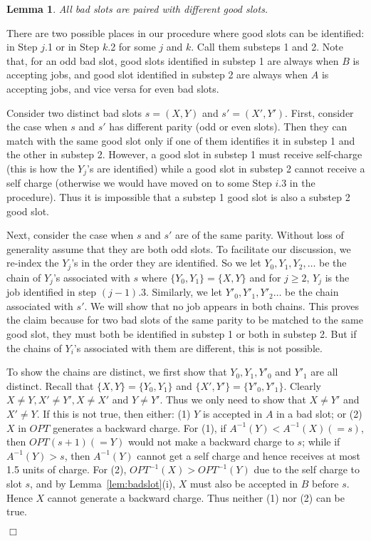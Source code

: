 \documentclass[11pt]{article}
\newtheorem{lemma}{Lemma}[section]
\newcommand{\qed}{\hspace*{\fill}$\Box$\par\medskip}
\newenvironment{proof}{\noindent{\it Proof. }\ignorespaces}{\qed}
\begin{document}
\begin{lemma} \label{lem:distinct}
All bad slots are paired with different good slots.
\end{lemma}
\begin{proof}
There are two possible places in our procedure where good slots can be
identified: in Step $j$.1 or in Step $k$.2 for some $j$ and $k$.
Call them substeps 1 and 2.
Note that, for an odd bad slot, good slots identified in substep 1 are 
always when $B$ is accepting jobs, and good slot identified in substep 2 are 
always when $A$ is accepting jobs, and vice versa for even bad slots.

Consider two distinct bad slots $s=(X,Y)$ and $s'=(X',Y')$.
First, consider the case when $s$ and $s'$ has different parity
(odd or even slots). 
Then they can match with the same good slot only if one of them identifies it 
in substep 1 and the other in substep 2.
However, a good slot in substep 1 must receive self-charge (this is how the 
$Y_j$'s are identified) while a good slot in substep 2
cannot receive a self charge (otherwise we would have moved on to some 
Step $i$.3 in the procedure).  
Thus it is impossible that a substep 1 good slot is
also a substep 2 good slot.

Next, consider the case when $s$ and $s'$ are of the same parity.
Without loss of generality assume that they are both odd slots.
To facilitate our discussion, we re-index the $Y_j$'s in the order
they are identified.
So we let $Y_0, Y_1, Y_2, \ldots$ be the chain of $Y_j$'s associated with $s$
where $\{Y_0, Y_1\} = \{X, Y\}$
and for $j \geq 2$, $Y_j$ is the job identified in step $(j-1)$.3.
Similarly, we let $Y'_0, Y'_1, Y'_2 \ldots$ be the chain associated with $s'$.
We will show that
no job appears in both chains.
This proves the claim because
for two bad slots of the same parity to be matched to the same good slot,
they must both be identified in substep 1 or both in substep 2.
But if the chains of $Y_i$'s associated with them are different,
this is not possible.

To show the chains are distinct,
we first show that $Y_0, Y_1, Y'_0$ and $Y'_1$ are all distinct.
Recall that $\{X,Y\}=\{Y_0,Y_1\}$ and $\{X',Y'\}=\{Y'_0,Y'_1\}$.
Clearly $X \neq Y, X' \neq Y', X \neq X'$ and $Y \neq Y'$.
Thus we only need to show that $X \neq Y'$ and $X' \neq Y$.
If this is not true, then either:
(1) $Y$ is accepted in $A$ in a bad slot; or
(2) $X$ in $OPT$ generates a backward charge.  
For (1), if $A^{-1}(Y) < A^{-1}(X) (=s)$, then $OPT(s+1) (=Y)$ 
would not make a backward charge to $s$; while if
$A^{-1}(Y) > s$, then $A^{-1}(Y)$ cannot get a self 
charge and hence receives at most 1.5 units of charge.
For (2), $OPT^{-1}(X) > OPT^{-1}(Y)$ due to the self charge to slot $s$, and 
by Lemma~\ref{lem:badslot}(i), $X$ must also be accepted in $B$ before $s$.  
Hence $X$ cannot generate a backward charge.
Thus neither (1) nor (2) can be true.


\end{proof}
\end{document}
